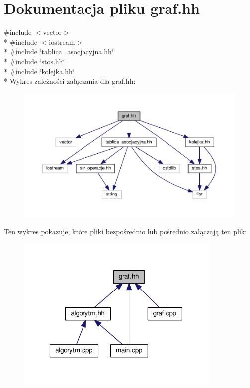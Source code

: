 \hypertarget{graf_8hh}{\section{Dokumentacja pliku graf.\-hh}
\label{graf_8hh}
}
{\ttfamily \#include $<$vector$>$}\\*
{\ttfamily \#include $<$iostream$>$}\\*
{\ttfamily \#include \char`\"{}tablica\-\_\-asocjacyjna.\-hh\char`\"{}}\\*
{\ttfamily \#include \char`\"{}stos.\-hh\char`\"{}}\\*
{\ttfamily \#include \char`\"{}kolejka.\-hh\char`\"{}}\\*
Wykres zależności załączania dla graf.\-hh\-:\nopagebreak
\begin{figure}[H]
\begin{center}
\leavevmode
\includegraphics[width=350pt]{graf_8hh__incl}
\end{center}
\end{figure}
Ten wykres pokazuje, które pliki bezpośrednio lub pośrednio załączają ten plik\-:\nopagebreak
\begin{figure}[H]
\begin{center}
\leavevmode
\includegraphics[width=279pt]{graf_8hh__dep__incl}
\end{center}
\end{figure}

